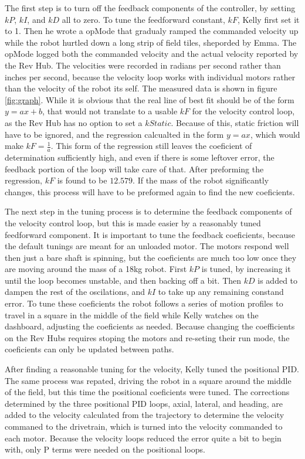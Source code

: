 \documentclass{article}
\begin{document}
The first step is to turn off the feedback components of the controller, by setting $kP$, $kI$, and $kD$ all to zero. To tune the feedforward constant, $kF$, Kelly first set it to 1. Then he wrote a opMode that gradualy ramped the commanded velocity up while the robot hurtled down a long strip of field tiles, sheporded by Emma. The opMode logged both the commanded velocity and the actual velocity reported by the Rev Hub. The velocities were recorded in radians per second rather than inches per second, because the velocity loop works with individual motors rather than the velocity of the robot its self. The measured data is shown in figure \ref{fig:graph}. While it is obvious that the real line of best fit should be of the form $y=ax+b$, that would not translate to a usable $kF$ for the velocity control loop, as the Rev Hub has no option to set a $kStatic$. Because of this, static friction will have to be ignored, and the regression calcualted in the form $y=ax$, which would make $kF = \frac{1}{a}$. This form of the regression still leaves the coeficient of determination sufficiently high, and even if there is some leftover error, the feedback portion of the loop will take care of that. After preforming the regression, $kF$ is found to be $12.579$. If the mass of the robot significantly changes, this process will have to be preformed again to find the new coeficients.

The next step in the tuning process is to determine the feedback components of the velocity control loop, but this is made easier by a reasonably tuned feedforward component. It is important to tune the feedback coeficients, because the default tunings are meant for an unloaded motor. The motors respond well then just a bare shaft is spinning, but the coeficients are much too low once they are moving around the mass of a 18kg robot. First $kP$ is tuned, by increasing it until the loop becomes unstable, and then backing off a bit. Then $kD$ is added to dampen the rest of the oscilations, and $kI$ to take up any remaining constand error. To tune these coeficients the robot follows a series of motion profiles to travel in a square in the middle of the field while Kelly watches on the dashboard, adjusting the coeficients as needed. Because changing the coefficients on the Rev Hubs requires stoping the motors and re-seting their run mode, the coeficients can only be updated between paths.

After finding a reasonable tuning for the velocity, Kelly tuned the positional PID. The same process was repated, driving the robot in a square around the middle of the field, but this time the positional coeficients were tuned. The corrections determined by the three positional PID loops, axial, lateral, and heading, are added to the velocity calculated from the trajectory to determine the velocity commaned to the drivetrain, which is turned into the velocity commanded to each motor. Because the velocity loops reduced the error quite a bit to begin with, only P terms were needed on the positional loops. 
\end{document}
